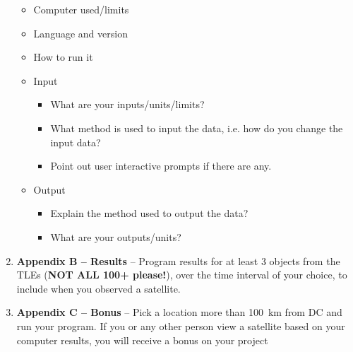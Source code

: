 \documentclass[11pt, reqno]{article}    %
\begin{document}
\begin{enumerate}
\begin{itemize}
            \item Computer used/limits
            \item Language and version
            \item How to run it
            \item Input
                \begin{itemize}
                    \item What are your inputs/units/limits?
                    \item What method is used to input the data, i.e. how do you change the input data?
                    \item Point out user interactive prompts if there are any.
                \end{itemize}
            \item Output
                \begin{itemize}
                    \item Explain the method used to output the data?
                    \item What are your outputs/units?
                \end{itemize}
        \end{itemize}
    \item \textbf{Appendix B -- Results} -- Program results for at least 3 objects from the TLEs (\textbf{NOT ALL 100+ please!}), over the time interval of your choice, to include when you observed a satellite.
    \item \textbf{Appendix C -- Bonus} -- Pick a location more than \SI{100}{\kilo\meter} from DC and run your program. 
        If you or any other person view a satellite based on your computer results, you will receive a bonus on your project
\end{enumerate}
\end{document}
